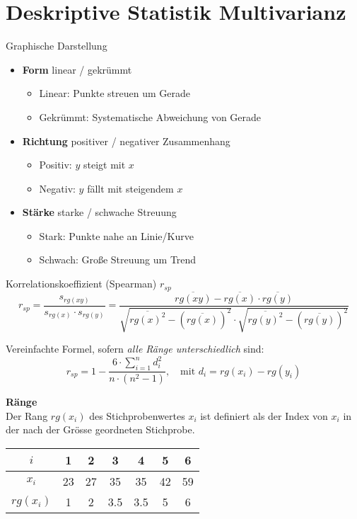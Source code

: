 \section{Deskriptive Statistik Multivarianz}

\begin{concept}{Graphische Darstellung}\\
\begin{itemize}
 \item \textbf{Form} \hspace{1.5cm} linear / gekrümmt
    \begin{itemize}
        \item Linear: Punkte streuen um Gerade
        \item Gekrümmt: Systematische Abweichung von Gerade
    \end{itemize}
 \item \textbf{Richtung} \hspace{0.85cm} positiver / negativer Zusammenhang
    \begin{itemize}
        \item Positiv: $y$ steigt mit $x$
        \item Negativ: $y$ fällt mit steigendem $x$
    \end{itemize}
 \item \textbf{Stärke} \hspace{1.2cm} starke / schwache Streuung
    \begin{itemize}
        \item Stark: Punkte nahe an Linie/Kurve
        \item Schwach: Große Streuung um Trend
    \end{itemize}
\end{itemize}
\end{concept}

\begin{definition}{Korrelationskoeffizient (Spearman) $r_{sp}$}\\
$$r_{sp} = \frac{s_{rg(xy)}}{s_{rg(x)} \cdot s_{rg(y)}} = \frac{\overline{rg(xy)} - \overline{rg(x)} \cdot \overline{rg(y)}}{\sqrt{\overline{rg(x)^2} - (\overline{rg(x)})^2} \cdot \sqrt{\overline{rg(y)^2} - (\overline{rg(y)})^2}}$$

Vereinfachte Formel, sofern \emph{alle Ränge unterschiedlich} sind:
$$r_{sp} = 1 - \frac{6 \cdot \sum_{i=1}^n d_i^2}{n \cdot (n^2 - 1)}, \quad \text{mit } d_i = rg(x_i) - rg(y_i)$$

\textbf{Ränge}\\
Der Rang $rg(x_i)$ des Stichprobenwertes $x_i$ ist definiert als der Index von $x_i$ in der nach der Grösse geordneten Stichprobe.

\begin{center}
\begin{tabular}{|c|c|c|c|c|c|c|}
\hline
$i$ & 1 & 2 & 3 & 4 & 5 & 6 \\
\hline
$x_i$ & 23 & 27 & 35 & 35 & 42 & 59 \\
\hline
$rg(x_i)$ & 1 & 2 & 3.5 & 3.5 & 5 & 6 \\
\hline
\end{tabular}
\end{center}
\end{definition}


